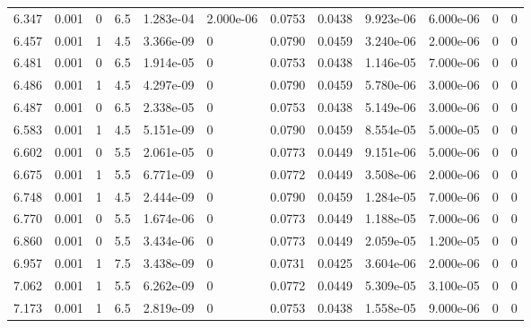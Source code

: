 \documentclass[preview]{standalone}
\begin{document}
{{{\begin{tabular}{L{1.2cm}C{1.2cm} C{0.3cm}C{0.5cm} C{1.4cm}C{1.4cm} C{1.4cm}C{1.4cm} C{1.6cm}C{1.6cm} C{1.6cm}C{1.6cm}}
  6.347  &  0.001  & 0     & 6.5 &  1.283e-04  & 2.000e-06  &  0.0753&   0.0438& 9.923e-06 & 6.000e-06   &  0 & 0  \\ 
  6.457  &  0.001  & 1     & 4.5 &  3.366e-09  & 0  &  0.0790&   0.0459& 3.240e-06 & 2.000e-06   &  0 & 0  \\ 
  6.481  &  0.001  & 0     & 6.5 &  1.914e-05  & 0  &  0.0753&   0.0438& 1.146e-05 & 7.000e-06   &  0 & 0  \\ 
  6.486  &  0.001  & 1     & 4.5 &  4.297e-09  & 0  &  0.0790&   0.0459& 5.780e-06 & 3.000e-06   &  0 & 0  \\ 
  6.487  &  0.001  & 0     & 6.5 &  2.338e-05  & 0  &  0.0753&   0.0438& 5.149e-06 & 3.000e-06   &  0 & 0  \\ 
  6.583  &  0.001  & 1     & 4.5 &  5.151e-09  & 0  &  0.0790&   0.0459& 8.554e-05 & 5.000e-05   &  0 & 0  \\ 
  6.602  &  0.001  & 0     & 5.5 &  2.061e-05  & 0  &  0.0773&   0.0449& 9.151e-06 & 5.000e-06   &  0 & 0  \\ 
  6.675  &  0.001  & 1     & 5.5 &  6.771e-09  & 0  &  0.0772&   0.0449& 3.508e-06 & 2.000e-06   &  0 & 0  \\ 
  6.748  &  0.001  & 1     & 4.5 &  2.444e-09  & 0  &  0.0790&   0.0459& 1.284e-05 & 7.000e-06   &  0 & 0  \\ 
  6.770  &  0.001  & 0     & 5.5 &  1.674e-06  & 0  &  0.0773&   0.0449& 1.188e-05 & 7.000e-06   &  0 & 0  \\ 
  6.860  &  0.001  & 0     & 5.5 &  3.434e-06  & 0  &  0.0773&   0.0449& 2.059e-05 & 1.200e-05   &  0 & 0  \\ 
  6.957  &  0.001  & 1     & 7.5 &  3.438e-09  & 0  &  0.0731&   0.0425& 3.604e-06 & 2.000e-06   &  0 & 0  \\ 
  7.062  &  0.001  & 1     & 5.5 &  6.262e-09  & 0  &  0.0772&   0.0449& 5.309e-05 & 3.100e-05   &  0 & 0  \\ 
  7.173  &  0.001  & 1     & 6.5 &  2.819e-09  & 0  &  0.0753&   0.0438& 1.558e-05 & 9.000e-06   &  0 & 0  \\ 
\hline 
\end{tabular} 

}}}
\end{document}

